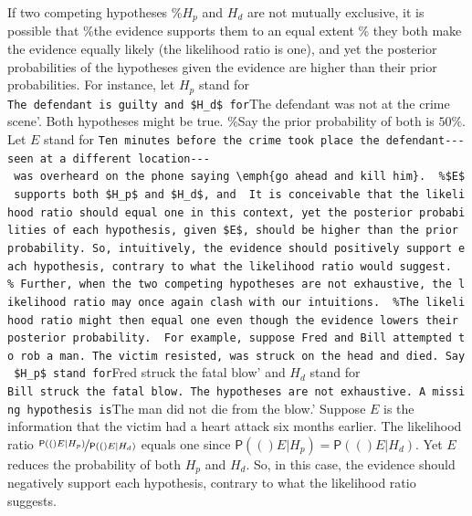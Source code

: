 \documentclass[10pt,dvipsnames,enabledeprecatedfontcommands]{scrartcl}
\newcommand{\pr}[1]{\mathsf{P}(#1)}
\begin{document}
If two competing hypotheses \%\(H_p\) and \(H_d\) are not mutually
exclusive, it is possible that \%the evidence supports them to an equal
extent \% they both make the evidence
equally likely (the likelihood ratio is one), and yet the posterior
probabilities of the hypotheses given the evidence are higher than their
prior probabilities. For instance, let \(H_p\) stand for
\texttt{The\ defendant\ is\ guilty\textquotesingle{}\ and\ \$H\_d\$\ for}The
defendant was not at the crime scene'. Both hypotheses might be true.
\%Say the prior probability of both is \(50\%\). Let \(E\) stand for
\texttt{Ten\ minutes\ before\ the\ crime\ took\ place\ the\ defendant-\/-\/-seen\ at\ a\ different\ location-\/-\/-\ was\ overheard\ on\ the\ phone\ saying\ \textbackslash{}emph\{go\ ahead\ and\ kill\ him\}.\textquotesingle{}\ \ \%\$E\$\ supports\ both\ \$H\_p\$\ and\ \$H\_d\$,\ and\ \ It\ is\ conceivable\ that\ the\ likelihood\ ratio\ should\ equal\ one\ in\ this\ context,\ yet\ the\ posterior\ probabilities\ of\ each\ hypothesis,\ given\ \$E\$,\ should\ be\ higher\ than\ the\ prior\ probability.\ So,\ intuitively,\ the\ evidence\ should\ positively\ support\ each\ hypothesis,\ contrary\ to\ what\ the\ likelihood\ ratio\ would\ suggest.\ \ \%\ Further,\ when\ the\ two\ competing\ hypotheses\ are\ not\ exhaustive,\ the\ likelihood\ ratio\ may\ once\ again\ clash\ with\ our\ intuitions.\ \ \%The\ likelihood\ ratio\ might\ then\ equal\ one\ even\ though\ the\ evidence\ lowers\ their\ posterior\ probability.\ \ For\ example,\ suppose\ Fred\ and\ Bill\ attempted\ to\ rob\ a\ man.\ The\ victim\ resisted,\ was\ struck\ on\ the\ head\ and\ died.\ Say\ \$H\_p\$\ stand\ for}Fred
struck the fatal blow' and \(H_d\) stand for
\texttt{Bill\ struck\ the\ fatal\ blow.\textquotesingle{}\ The\ hypotheses\ are\ not\ exhaustive.\ A\ missing\ hypothesis\ is}The
man did not die from the blow.' Suppose \(E\) is the information that
the victim had a heart attack six months earlier. The likelihood ratio
\(\nicefrac{\pr(E \vert H_p)}{\pr(E \vert H_d)}\) equals one since
\(\pr(E\vert H_p)=\pr(E\vert H_d)\). Yet \(E\) reduces the probability
of both \(H_p\) and \(H_d\). So, in this case, the evidence should
negatively support each hypothesis, contrary to what the likelihood
ratio suggests.
\end{document}
